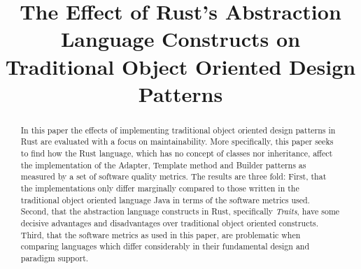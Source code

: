 \documentclass[conference]{IEEEtran}
\begin{document}
%

\title{The Effect of Rust's Abstraction Language Constructs on Traditional Object Oriented Design Patterns}

\author{
}

\maketitle

\begin{abstract}
    In this paper the effects of implementing traditional object oriented design patterns in Rust are evaluated with a focus on maintainability.
    More specifically, this paper seeks to find how the Rust language, which has no concept of classes nor inheritance, affect the implementation of the Adapter, Template method and Builder patterns as measured by a set of software quality metrics.
    The results are three fold:
    First, that the implementations only differ marginally compared to those written in the traditional object oriented language Java in terms of the software metrics used.
    Second, that the abstraction language constructs in Rust, specifically \emph{Traits}, have some decisive advantages and disadvantages over traditional object oriented constructs.
    Third, that the software metrics as used in this paper, are problematic when comparing languages which differ considerably in their fundamental design and paradigm support.
\end{abstract}

\IEEEpeerreviewmaketitle
\end{document}
